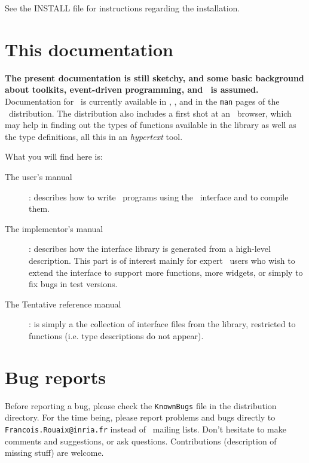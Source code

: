 See the INSTALL file for instructions regarding the installation.


\section*{This documentation}
{\bf The present documentation is still sketchy, and some basic background
about toolkits, event-driven programming, and \tk\ is assumed.}
Documentation for \tk\ is currently available in \cite{ouster94},
\cite{welch94}, and in the {\tt man} pages of the \tk\ distribution.
The distribution also includes a first shot at an \caml\ browser, which may
help in finding out the types of functions available in the library as well as
the type definitions, all this in an {\em hypertext} tool.


What you will find here is:
\begin{description}
\item[The user's manual] : describes how to write \caml\ programs using the
\tk\ interface and to compile them. 
\item[The implementor's manual] : describes how the interface library is
generated from a high-level description. This part is of interest mainly for
expert \tk\ users who wish to extend the interface to support more
functions, more widgets, or simply to fix bugs in test versions.
\item[The Tentative reference manual] : is simply a the collection of
interface files from the library, restricted to functions (i.e. type
descriptions do not appear). 
\end{description}

\section*{Bug reports}
Before reporting a bug, please check the \verb|KnownBugs| file in the
distribution directory.
For the time being, please report problems and bugs directly to
\verb|Francois.Rouaix@inria.fr| instead of \caml\ mailing lists.
Don't hesitate to make comments and suggestions, or ask questions.
Contributions (description of missing stuff) are welcome.


\tableofcontents





